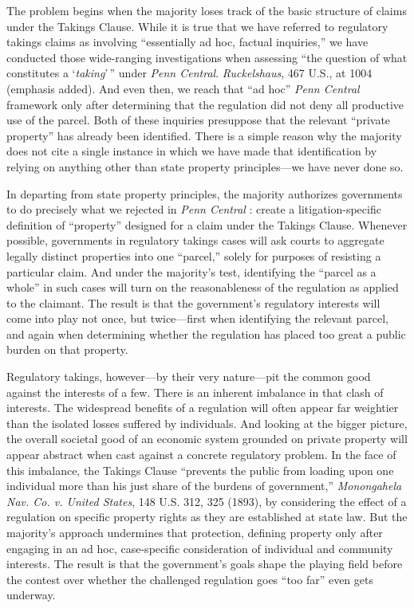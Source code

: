 The problem begins when the majority loses track of the basic structure of
claims under the Takings Clause. While it is true that we have referred to
regulatory takings claims as involving ``essentially ad hoc, factual
inquiries,'' we have conducted those wide-ranging investigations when assessing
``the question of what constitutes a `\textit{taking}'\,'' under \textit{Penn
Central}. \textit{Ruckelshaus}, 467 U.S., at 1004 (emphasis added). And even
then, we reach that ``ad hoc'' \textit{Penn Central} framework only after
determining that the regulation did not deny all productive use of the parcel.
Both of these inquiries presuppose that the relevant ``private property'' has
already been identified. There is a simple reason why the majority does not cite
a single instance in which we have made that identification by relying on
anything other than state property principles---we have never done so.

In departing from state property principles, the majority authorizes governments
to do precisely what we rejected in \textit{Penn Central} : create a
litigation-specific definition of ``property'' designed for a claim under the
Takings Clause. Whenever possible, governments in regulatory takings cases will
ask courts to aggregate legally distinct properties into one ``parcel,'' solely
for purposes of resisting a particular claim. And under the majority's test,
identifying the ``parcel as a whole'' in such cases will turn on the
reasonableness of the regulation as applied to the claimant. The result is that
the government's regulatory interests will come into play not once, but
twice---first when identifying the relevant parcel, and again when determining
whether the regulation has placed too great a public burden on that property.

Regulatory takings, however---by their very nature---pit the common good against
the interests of a few. There is an inherent imbalance in that clash of
interests. The widespread benefits of a regulation will often appear far
weightier than the isolated losses suffered by individuals. And looking at the
bigger picture, the overall societal good of an economic system grounded on
private property will appear abstract when cast against a concrete regulatory
problem. In the face of this imbalance, the Takings Clause ``prevents the public
from loading upon one individual more than his just share of the burdens of
government,'' \textit{Monongahela Nav. Co. v. United States}, 148 U.S. 312, 325
(1893), by considering the effect of a regulation on specific property rights as
they are established at state law. But the majority's approach undermines that
protection, defining property only after engaging in an ad hoc, case-specific
consideration of individual and community interests. The result is that the
government's goals shape the playing field before the contest over whether the
challenged regulation goes ``too far'' even gets underway.

